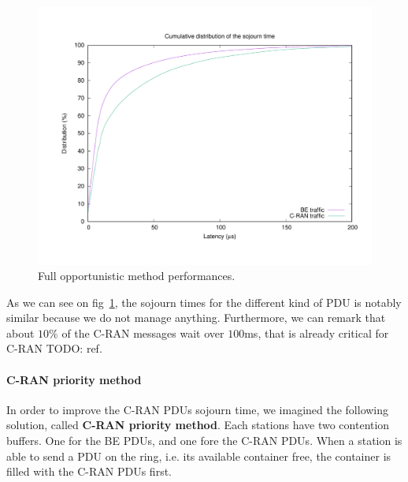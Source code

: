 \documentclass[a4paper,10pt,english]{article}
\newcommand{\todo}[1]{{\color{red} TODO: {#1}}}
\begin{document}
    \begin{figure}[h!]
    \label{fig:oport}
        \begin{center}
      \includegraphics[scale=0.4]{oport}

      \caption{Full opportunistic method performances.}
      \end{center}
  \end{figure}
  
  As we can see on fig~\ref{fig:oport}, the sojourn times for the different kind of PDU is notably similar because we do not manage anything. Furthermore, we can remark that about $10\%$ of the C-RAN messages wait over $100$ms, that is already critical for C-RAN \todo{ref}.

\paragraph{C-RAN priority method}
\label{sec:cranprio}
  In order to improve the C-RAN PDUs sojourn time, we imagined the following solution, called {\bf C-RAN priority method}. Each stations have two contention buffers. One for the BE PDUs, and one fore the C-RAN PDUs. When a station is able to send a PDU on the ring, i.e. its available container free, the container is filled with the C-RAN PDUs first. 
  
\end{document}
